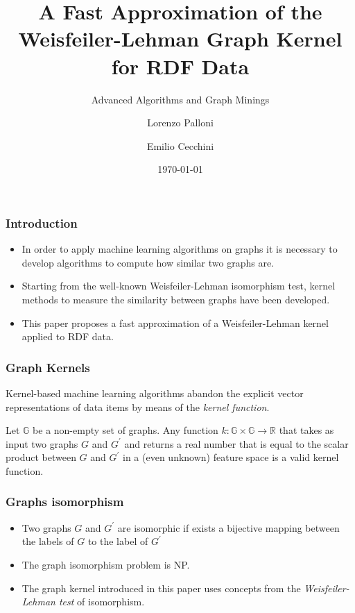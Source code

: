 \documentclass{beamer}
\title[A Fast Approximation of WL RDF kernel]{A Fast Approximation of the Weisfeiler-Lehman Graph Kernel for RDF Data}
\subtitle{Advanced Algorithms and Graph Minings}
\author{Lorenzo Palloni \and Emilio Cecchini}
\institute[]{
    Università Degli Studi di Firenze \\
    \medskip
    \textit{lorenzo.palloni@stud.unifi.it \and emilio.cecchini@stud.unifi.it}
}
\date{\today}
\begin{document}
\begin{frame}
\titlepage %
\end{frame}


\begin{frame}
\frametitle{Introduction}

\begin{itemize}
\item
In order to apply machine learning algorithms on graphs it is necessary to develop algorithms to compute how similar two graphs are.

\item
Starting from the well-known Weisfeiler-Lehman isomorphism test, kernel methods to measure the similarity between graphs have been developed.

\item
This paper proposes a fast approximation of a Weisfeiler-Lehman kernel applied to RDF data.


\end{itemize}

\end{frame}

\begin{frame}
\frametitle{Graph Kernels}

Kernel-based machine learning algorithms abandon the explicit vector representations of data items by means of the \textit{kernel function}.

\begin{definition}
Let $\mathbb{G}$ be a non-empty set of graphs. Any function $k: \mathbb{G} \times \mathbb{G} \rightarrow \mathbb{R}$ that takes as input two graphs $G$ and $G^\prime$ and returns a real number that is equal to the scalar product between $G$ and $G^\prime$ in a (even unknown) feature space is a valid kernel function.
\end{definition}

\end{frame}


\begin{frame}
\frametitle{Graphs isomorphism}

\begin{itemize}
\item
Two graphs $G$ and $G^\prime$ are isomorphic if exists a bijective mapping between the labels of $G$ to the label of $G^\prime$

\item
The graph isomorphism problem is NP.

\item
The graph kernel introduced in this paper uses concepts from the \textit{Weisfeiler-Lehman test} of isomorphism.
\end{itemize}

\end{frame}
\end{document}
